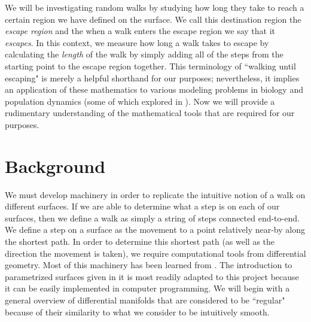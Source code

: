 \documentclass[12pt]{article}
\begin{document}
	We will be investigating random walks by studying how long they take to reach a certain region we have defined on the surface.
	We call this destination region the \emph{escape region} and the when a walk enters the escape region we say that it \emph{escapes}.
	In this context, we measure how long a walk takes to escape by calculating the \emph{length} of the walk by simply adding all of the steps from the starting point to the escape region together.
	This terminology of ``walking until escaping" is merely a helpful shorthand for our purposes; nevertheless, it implies an application of these mathematics to various modeling problems in biology and population dynamics (some of which explored in \cite{Codling_WalksBiology_2008}).
	Now we will provide a rudimentary understanding of the mathematical tools that are required for our purposes.

\section{Background}
	We must develop machinery in order to replicate the intuitive notion of a walk on different surfaces.
	If we are able to determine what a step is on each of our surfaces, then we define a walk as simply a string of steps connected end-to-end.
	We define a step on a surface as the movement to a point relatively near-by along the shortest path.
	In order to determine this shortest path (as well as the direction the movement is taken), we require computational tools from differential geometry.
	Most of this machinery has been learned from \cite{BanchoffLovett_DiffGeo_2010}.
	The introduction to parametrized surfaces given in it is most readily adapted to this project because it can be easily implemented in computer programming.
	We will begin with a general overview of differential manifolds that are considered to be ``regular" because of their similarity to what we consider to be intuitively smooth.
	
\end{document}
